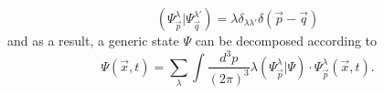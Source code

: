 \documentclass[11pt]{article}
\numberwithin{equation}{section}
\begin{document}
      \begin{equation}
        (\Psi^\lambda_{\vec p}|\Psi^{\lambda'}_{\vec q}) = \lambda \delta_{\lambda\lambda'} \delta(\vec p - \vec q)
      \end{equation}
      and as a result, a generic state $\Psi$ can be decomposed according to
      \begin{equation}
        \Psi(\vec x, t) = \sum_\lambda \int \frac{d^3p}{(2\pi)^3} \lambda (\Psi^\lambda_{\vec p}|\Psi) \cdot \Psi^\lambda_{\vec p}(\vec x, t).
      \end{equation}
\end{document}

